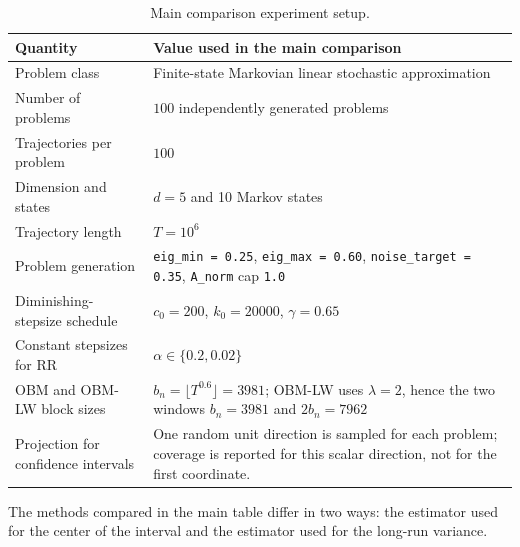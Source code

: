 \begin{table}[htbp]
\caption{Main comparison experiment setup.}
\centering
\small
\begin{tabularx}{\textwidth}{>{\raggedright\arraybackslash}p{}X}
\toprule
\textbf{Quantity} & \textbf{Value used in the main comparison} \\
\midrule
Problem class & Finite-state Markovian linear stochastic approximation \\
Number of problems & $100$ independently generated problems \\
Trajectories per problem & $100$ \\
Dimension and states & $d=5$ and 10 Markov states \\
Trajectory length & $T=10^6$ \\
Problem generation & \texttt{eig\_min = 0.25}, \texttt{eig\_max = 0.60},
  \texttt{noise\_target = 0.35}, \texttt{A\_norm} cap \texttt{1.0} \\
Diminishing-stepsize schedule & $c_0=200$, $k_0=20000$, $\gamma=0.65$ \\
Constant stepsizes for RR & $\alpha\in\{0.2,0.02\}$ \\
OBM and OBM-LW block sizes & $b_n=\lfloor T^{0.6}\rfloor=3981$; OBM-LW
  uses $\lambda=2$, hence the two windows $b_n=3981$ and $2b_n=7962$ \\
Projection for confidence intervals & One random unit direction is sampled for
  each problem; coverage is reported for this scalar direction, not for the
  first coordinate. \\
\bottomrule
\end{tabularx}
\end{table}

The methods compared in the main table differ in two ways: the estimator used
for the center of the interval and the estimator used for the long-run
variance.

